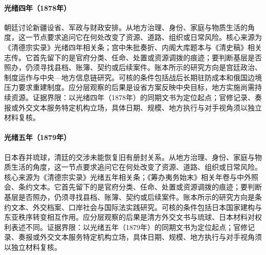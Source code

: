 \hypertarget{social:EQ-1878-XINJIANG-PROVINCE-DEBATE}{}\paragraph{光绪四年（1878年）}朝廷讨论新疆设省、军政与财政安排。从地方治理、身份、家庭与物质生活的角度，这一节点要求追问它在何处改变了资源、道路、组织或日常风险。核心来源为《清德宗实录》光绪四年相关条；宫中朱批奏折、内阁大库题本与《清史稿》相关志传。它首先留下的是官府分类、任命、处置或资源调拨的痕迹；要判断基层是否照办，仍须寻找县档、账簿、契约或后续案件。账本所示的研究方向是宫廷政治、制度运作与中央—地方信息链研究。可核的条件包括战后长期驻防成本和俄国边境压力要求重建制度。应分层观察的后果是设省方案反映中央目标，地方实施尚需持续资源。证据界限：以光绪四年（1878年）的同期文书为定位起点；官修记录、奏报或外交文本服务特定机构立场，具体日期、规模、地方执行与对手视角须以独立材料复核。
\hypertarget{social:EQ-1879-RYUKYU-ANNEXATION}{}\paragraph{光绪五年（1879年）}日本吞并琉球，清廷的交涉未能恢复旧有册封关系。从地方治理、身份、家庭与物质生活的角度，这一节点要求追问它在何处改变了资源、道路、组织或日常风险。核心来源为《清德宗实录》光绪五年相关条；《筹办夷务始末》相关年卷与中外照会、条约文本。它首先留下的是官府分类、任命、处置或资源调拨的痕迹；要判断基层是否照办，仍须寻找县档、账簿、契约或后续案件。账本所示的研究方向是条约文本、外交档案、口岸社会与国际法实践研究。可核的条件包括日本国家建构与东亚秩序转变相互作用。应分层观察的后果是清方外交文书与琉球、日本材料对权利表述不同。证据界限：以光绪五年（1879年）的同期文书为定位起点；官修记录、奏报或外交文本服务特定机构立场，具体日期、规模、地方执行与对手视角须以独立材料复核。
